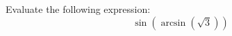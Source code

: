 \documentclass{ximera}
\author{David Kish}
\begin{document}
\begin{exercise}
Evaluate the following expression:
\[
\sin(\arcsin(\sqrt{3}))
\]
\begin{multipleChoice}
\end{multipleChoice}
\end{exercise}
\end{document}
